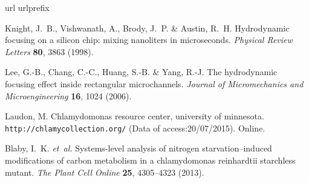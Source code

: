 \documentclass[aps,pra,reprint,longbibliography,groupedaddress]{revtex4-1}
\begin{document}
% 
% 
\begin{thebibliography}{1}
\expandafter\ifx\csname url\endcsname\relax
  \def\url#1{\texttt{#1}}\fi
\expandafter\ifx\csname urlprefix\endcsname\relax\def\urlprefix{URL }\fi
\providecommand{\bibinfo}[2]{#2}
\providecommand{\eprint}[2][]{\url{#2}}

\bibinfo{author}{Knight, J.~B.}, \bibinfo{author}{Vishwanath, A.},
  \bibinfo{author}{Brody, J.~P.} \& \bibinfo{author}{Austin, R.~H.}
\newblock \bibinfo{title}{Hydrodynamic focusing on a silicon chip: mixing
  nanoliters in microseconds}.
\newblock \emph{\bibinfo{journal}{Physical Review Letters}}
  \textbf{\bibinfo{volume}{80}}, \bibinfo{pages}{3863} (\bibinfo{year}{1998}).

\bibinfo{author}{Lee, G.-B.}, \bibinfo{author}{Chang, C.-C.},
  \bibinfo{author}{Huang, S.-B.} \& \bibinfo{author}{Yang, R.-J.}
\newblock \bibinfo{title}{The hydrodynamic focusing effect inside rectangular
  microchannels}.
\newblock \emph{\bibinfo{journal}{Journal of Micromechanics and
  Microengineering}} \textbf{\bibinfo{volume}{16}}, \bibinfo{pages}{1024}
  (\bibinfo{year}{2006}).

\bibinfo{author}{Laudon, M.}
\newblock \bibinfo{title}{Chlamydomonas resource center, university of
  minnesota}.
\newblock \bibinfo{howpublished}{\url{http://chlamycollection.org/}}
  (\bibinfo{year}{Data of access:20/07/2015}).
\newblock \bibinfo{note}{Online}.

\bibinfo{author}{Blaby, I.~K.} \emph{et~al.}
\newblock \bibinfo{title}{Systems-level analysis of nitrogen
  starvation--induced modifications of carbon metabolism in a chlamydomonas
  reinhardtii starchless mutant}.
\newblock \emph{\bibinfo{journal}{The Plant Cell Online}}
  \textbf{\bibinfo{volume}{25}}, \bibinfo{pages}{4305--4323}
  (\bibinfo{year}{2013}).

\end{thebibliography}
\end{document}
